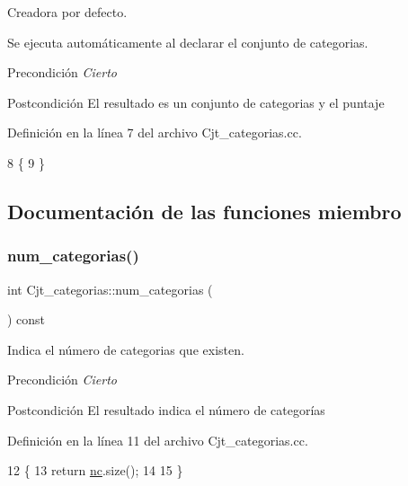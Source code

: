 Creadora por defecto. 

Se ejecuta automáticamente al declarar el conjunto de categorias. \begin{DoxyPrecond}{Precondición}
{\itshape Cierto} 
\end{DoxyPrecond}
\begin{DoxyPostcond}{Postcondición}
El resultado es un conjunto de categorias y el puntaje 
\end{DoxyPostcond}


Definición en la línea 7 del archivo Cjt\+\_\+categorias.\+cc.


\begin{DoxyCode}
8 \{
9 \}
\end{DoxyCode}


\subsection{Documentación de las funciones miembro}
\mbox{\label{class_cjt__categorias_a8d99bf913eb3aaf562e5a086faaae517}} 
\subsubsection{\texorpdfstring{num\+\_\+categorias()}{num\_categorias()}}
{\footnotesize\ttfamily int Cjt\+\_\+categorias\+::num\+\_\+categorias (\begin{DoxyParamCaption}{ }\end{DoxyParamCaption}) const}



Indica el número de categorias que existen. 

\begin{DoxyPrecond}{Precondición}
{\itshape Cierto} 
\end{DoxyPrecond}
\begin{DoxyPostcond}{Postcondición}
El resultado indica el número de categorías 
\end{DoxyPostcond}


Definición en la línea 11 del archivo Cjt\+\_\+categorias.\+cc.


\begin{DoxyCode}
12 \{
13     \textcolor{keywordflow}{return} \hyperlink{class_cjt__categorias_aad3febb4a17038ba65b2f79a4a509289}{nc}.size();
14 
15 \}
\end{DoxyCode}
\mbox{\label{class_cjt__categorias_a25f0264b46b1c1de5af074bfae1ee5ed}} 
